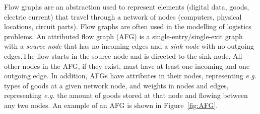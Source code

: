 Flow graphs are an abstraction used to represent elements (\eg digital data, goods, electric current) that travel through a network of nodes (\eg computers, physical locations, circuit parts). Flow graphs are often used in the modelling of logistics problems. An attributed flow graph (AFG) is a single-entry/single-exit graph with a \emph{source node} that has no incoming edges and a \emph{sink node} with no outgoing edges.The flow starts in the source node and is directed to the sink node. All other nodes in the AFG, if they exist, must have at least one incoming and one outgoing edge. In addition, AFGs have attributes in their nodes, representing \emph{e.g.} types of goods at a given network node, and weights in nodes and edges, representing \emph{e.g.} the amount of goods stored at that node and flowing between any two nodes. An example of an AFG is shown in Figure~\ref{fig:AFG}.

